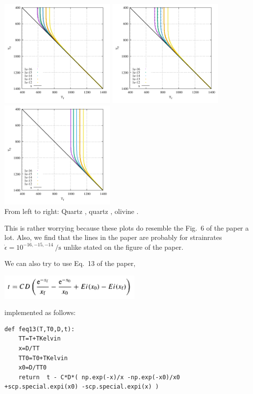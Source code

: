 \begin{center}
\includegraphics[width=5.7cm]{python_codes/fieldstone_167/1zero/fig6.pdf}
\includegraphics[width=5.7cm]{python_codes/fieldstone_167/2zero/fig6.pdf}
\includegraphics[width=5.7cm]{python_codes/fieldstone_167/3zero/fig6.pdf}\\
{\captionfont From left to right: Quartz \cite{brko80}, quartz \cite{stsa94}, olivine \cite{brko80}.}
\end{center}

This is rather worrying because these plots do resemble the Fig.~6 of the paper a lot.
Also, we find that the lines in the paper are probably for strainrates 
$\dot{\epsilon}=10^{-16,-15,-14}~\si{\per\second}$ unlike stated on the figure of the paper.


We can also try to use Eq.~13 of the paper, 
\begin{center}
\includegraphics[width=7cm]{python_codes/fieldstone_167/images/stuw98_eq}
\end{center}
implemented as follows: 
\begin{lstlisting}
def feq13(T,T0,D,t):
    TT=T+TKelvin
    x=D/TT
    TT0=T0+TKelvin
    x0=D/TT0
    return  t - C*D*( np.exp(-x)/x -np.exp(-x0)/x0 +scp.special.expi(x0) -scp.special.expi(x) ) 
\end{lstlisting}

